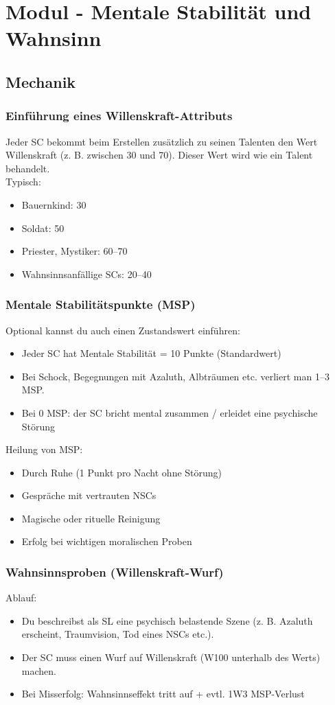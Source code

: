 \chapter{Modul - Mentale Stabilität und Wahnsinn}
\section{Mechanik}
\subsection{Einführung eines Willenskraft-Attributs} 
Jeder SC bekommt beim Erstellen zusätzlich zu seinen Talenten den Wert Willenskraft (z. B. zwischen 30 und 70). Dieser Wert wird wie ein Talent behandelt.\\
Typisch: 
\begin{itemize}
\item Bauernkind: 30
\item Soldat: 50
\item Priester, Mystiker: 60–70
\item Wahnsinnsanfällige SCs: 20–40
\end{itemize}
\subsection{Mentale Stabilitätspunkte (MSP)}
Optional kannst du auch einen Zustandswert einführen:
\begin{itemize}
\item Jeder SC hat Mentale Stabilität = 10 Punkte (Standardwert)
\item Bei Schock, Begegnungen mit Azaluth, Albträumen etc. verliert man 1–3 MSP.
\item Bei 0 MSP: der SC bricht mental zusammen / erleidet eine psychische Störung
\end{itemize}
Heilung von MSP:
\begin{itemize}
\item Durch Ruhe (1 Punkt pro Nacht ohne Störung)
\item Gespräche mit vertrauten NSCs
\item Magische oder rituelle Reinigung
\item Erfolg bei wichtigen moralischen Proben
\end{itemize}
\subsection{Wahnsinnsproben (Willenskraft-Wurf)}
Ablauf:
\begin{itemize}
\item Du beschreibst als SL eine psychisch belastende Szene (z. B. Azaluth erscheint, Traumvision, Tod eines NSCs etc.).
\item Der SC muss einen Wurf auf Willenskraft (W100 unterhalb des Werts) machen.
\item Bei Misserfolg: Wahnsinnseffekt tritt auf + evtl. 1W3 MSP-Verlust
\end{itemize}
